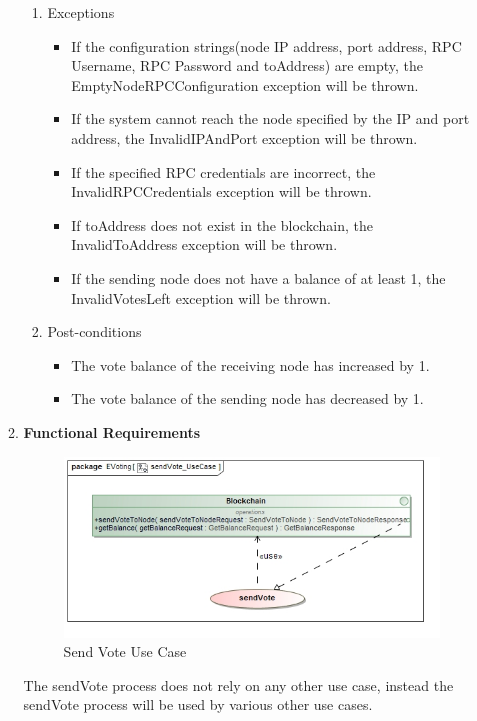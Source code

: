 \begin{enumerate}
\begin{enumerate}
\begin{enumerate}
					\item Exceptions
					\begin{itemize}
						\item If the configuration strings(node IP address, port address, RPC Username, RPC Password and toAddress) are empty, the EmptyNodeRPCConfiguration exception will be thrown.
						\item If the system cannot reach the node specified by the IP and port address, the InvalidIPAndPort exception will be thrown.
						\item If the specified RPC credentials are incorrect, the InvalidRPCCredentials exception will be thrown.
						\item If toAddress does not exist in the blockchain, the InvalidToAddress exception will be thrown.
						\item If the sending node does not have a balance of at least 1, the InvalidVotesLeft exception will be thrown.
					\end{itemize}
					
					\item Post-conditions
					\begin{itemize}
						\item The vote balance of the receiving node has increased by 1.
						\item The vote balance of the sending node has decreased by 1.
					\end{itemize}
				\end{enumerate}

			
			\item \textbf{Functional Requirements}
				\begin{figure}[H]
					\centering
					\includegraphics[width=0.75\linewidth]{../Images/Blockchain/UseCase/sendVote_UseCase.jpg}
					\caption{Send Vote Use Case}
				\end{figure}
				The sendVote process does not rely on any other use case, instead the sendVote process will be used by various other use cases.
				\newline
			

\end{enumerate}
\end{enumerate}
